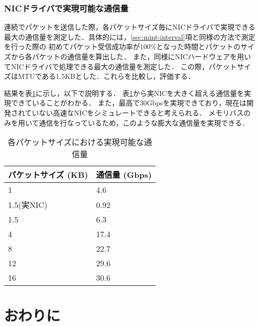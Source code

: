 \documentclass[submit,techreq,noauthor,dvipdfmx]{ipsj}
\begin{document}
\subsubsection{NICドライバで実現可能な通信量}\label{sec:interval}

連続でパケットを送信した際，各パケットサイズ毎にNICドライバで実現できる
最大の通信量を測定した．具体的には，\ref{sec:mint-interval}項と同様の方法で測定を行った際の
初めてパケット受信成功率が100\%となった時間とパケットのサイズから各パケットの通信量を算出した．
また，同様にNICハードウェアを用いてNICドライバで処理できる最大の通信量を測定した．
この際，パケットサイズはMTUである1.5KBとした．これらを比較し，評価する．

結果を表\ref{throughput-nic}に示し，以下で説明する．
表\ref{throughput-nic}から実NICを大きく超える通信量を実現できていることがわかる．
また，最高で30Gbpsを実現できており，現在は開発されていない高速なNICをシミュレートできると考えられる．
メモリバスのみを用いて通信を行なっているため，このような膨大な通信量を実現できる．

\begin{table}[h]
    \caption{各パケットサイズにおける実現可能な通信量}
    \label{throughput-nic}
    \begin{center}
        \begin{tabular}{l|l}   \hline \hline 
            パケットサイズ (KB)      & 通信量 (Gbps)  \\ \hline
            1                        & 4.6            \\
            1.5(実NIC)               & 0.92           \\
            1.5                      & 6.3            \\
            4                        & 17.4           \\
            8                        & 22.7           \\
            12                       & 29.6           \\
            16                       & 30.6           \\ \hline
        \end{tabular}
    \end{center}
\end{table}


\section{おわりに}\label{chap:conclusion}
\end{document}
